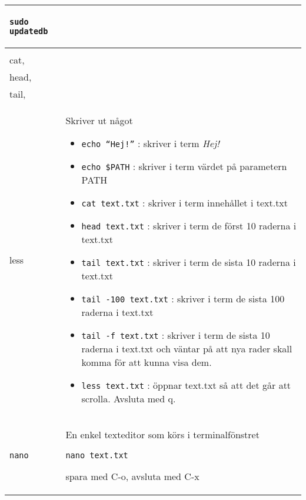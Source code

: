 \documentclass[a4paper]{article}
\begin{document}
\begin{longtable}{l|l}
\begin{minipage}[t]{0.8\textwidth}
\begin{verbatim}
sudo updatedb
\end{verbatim}
  \end{minipage}
  \\
  \midrule
  \begin{minipage}[t]{0.2\textwidth} 
    \texttt{echo,\\ cat,\\ head,\\ tail,\\ less}
  \end{minipage}
  &
  \begin{minipage}[t]{0.8\textwidth} 
Skriver ut n{\aa}got

\begin{itemize}

\item
  \texttt{echo ``Hej!''} : skriver i term \emph{Hej!}
\item
  \texttt{echo \$PATH} : skriver i term v\"ardet p{\aa} parametern PATH
\item
  \texttt{cat text.txt} : skriver i term inneh{\aa}llet i text.txt
\item
  \texttt{head text.txt} : skriver i term de f\"orst 10 raderna i text.txt
\item
  \texttt{tail text.txt} : skriver i term de sista 10 raderna i text.txt
\item
  \texttt{tail -100 text.txt} : skriver i term de sista 100 raderna i text.txt
\item
  \texttt{tail -f text.txt} : skriver i term de sista 10 raderna i text.txt och
  v\"antar p{\aa} att nya rader skall komma f\"or att kunna visa dem.
\item
  \texttt{less text.txt} : \"oppnar text.txt s{\aa} att det g{\aa}r att scrolla. Avsluta
  med q.
\end{itemize}

  \end{minipage}
  \\
  \midrule
  \begin{minipage}[t]{0.2\textwidth} 
    \texttt{nano}
  \end{minipage}
  &
  \begin{minipage}[t]{0.8\textwidth} 
En enkel texteditor som k\"ors i terminalf\"onstret

\begin{verbatim}
nano text.txt
\end{verbatim}

spara med C-o, avsluta med C-x


\end{minipage}
\end{longtable}
\end{document}
